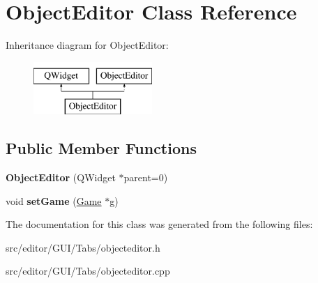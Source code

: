 \hypertarget{class_object_editor}{}\section{Object\+Editor Class Reference}
\label{class_object_editor}
Inheritance diagram for Object\+Editor\+:\begin{figure}[H]
\begin{center}
\leavevmode
\includegraphics[height=2.000000cm]{class_object_editor}
\end{center}
\end{figure}
\subsection*{Public Member Functions}
\begin{DoxyCompactItemize}
\item 
\hypertarget{class_object_editor_a7a84cedc42e8c15e3c461e7b6db2f196}{}\label{class_object_editor_a7a84cedc42e8c15e3c461e7b6db2f196} 
{\bfseries Object\+Editor} (Q\+Widget $\ast$parent=0)
\item 
\hypertarget{class_object_editor_ae6402ec2acc0b45b142bf61eff453b7e}{}\label{class_object_editor_ae6402ec2acc0b45b142bf61eff453b7e} 
void {\bfseries set\+Game} (\hyperlink{class_game}{Game} $\ast$g)
\end{DoxyCompactItemize}


The documentation for this class was generated from the following files\+:\begin{DoxyCompactItemize}
\item 
src/editor/\+G\+U\+I/\+Tabs/objecteditor.\+h\item 
src/editor/\+G\+U\+I/\+Tabs/objecteditor.\+cpp\end{DoxyCompactItemize}
